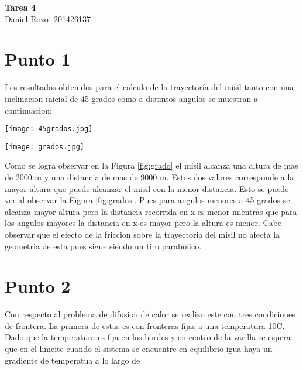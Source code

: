 \documentclass[12pt]{article}
\begin{document}
\begin{center}
 {\Large \textbf{Tarea 4}}\\
 Daniel Rozo -201426137\\
\end{center}
\section{Punto 1}
\noindent Los resultados obtenidos para el calculo de la trayectoría del misil tanto con una inclinacion inicial de 45 grados como a distintos angulos se muestran a continuacion:

\begin{centering}
\captionsetup{type=figure}
\texttt{[image: 45grados.jpg]}
\label{fig:grado}
\end{centering}


\begin{centering}
\captionsetup{type=figure}
\texttt{[image: grados.jpg]}
\label{fig:grados}
\end{centering}

\noindent Como se logra observar en la Figura \ref{fig:grado} el misil alcanza una altura de mas de 2000 m y una distancia de mas de 9000 m. Estos dos valores corresponde a la mayor altura que puede alcanzar el misil con la menor distancia. Esto se puede ver al observar la Figura \ref{fig:grados}. Pues para angulos menores a 45 grados se alcanza mayor altura pero la distancia recorrida en x es menor mientras que para los angulos mayores la distancia en x es mayor pero la altura es menor. Cabe observar que el efecto de la friccion sobre la trayectoria del misil no afecta la geometria de esta pues sigue siendo un tiro parabolico. 

\section{Punto 2}

Con respecto al problema de difusion de calor se realizo este con tres condiciones de frontera. La primera de estas es con fronteras fijas a una temperatura 10\degree C. Dado que la temperatura es fija en los bordes y en centro de la varilla se espera que en el limeite cuando el sistema se encuentre en equilibrio igua haya un gradiente de temperatua a lo largo de 
\end{document}

